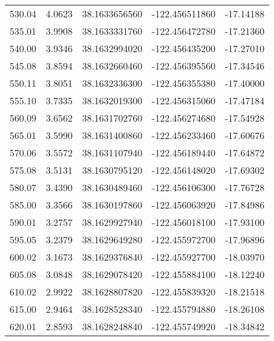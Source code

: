 \begin{scriptsize}
\begin{longtable}{p{2.5cm}p{2.5cm}p{3cm}p{3cm}p{2.5cm}}
           530.04  & 	 4.0623 &               38.1633656560  &   -122.456511860   &	-17.14188 \\
           535.01  & 	 3.9908 &               38.1633331760  &   -122.456472780   &	-17.21360 \\
           540.00  & 	 3.9346 &               38.1632994020  &   -122.456435200   &	-17.27010 \\
           545.08  & 	 3.8594 &               38.1632660460  &   -122.456395560   &	-17.34546 \\
           550.11  & 	 3.8051 &               38.1632336300  &   -122.456355380   &	-17.40000 \\
           555.10  & 	 3.7335 &               38.1632019300  &   -122.456315060   &	-17.47184 \\
           560.09  & 	 3.6562 &               38.1631702760  &   -122.456274680   &	-17.54928 \\
           565.01  & 	 3.5990 &               38.1631400860  &   -122.456233460   &	-17.60676 \\
           570.06  & 	 3.5572 &               38.1631107940  &   -122.456189440   &	-17.64872 \\
           575.08  & 	 3.5131 &               38.1630795120  &   -122.456148020   &	-17.69302 \\
           580.07  & 	 3.4390 &               38.1630489460  &   -122.456106300   &	-17.76728 \\
           585.00  & 	 3.3566 &               38.1630197860  &   -122.456063920   &	-17.84986 \\
           590.01  & 	 3.2757 &               38.1629927940  &   -122.456018100   &	-17.93100 \\
           595.05  & 	 3.2379 &               38.1629649280  &   -122.455972700   &	-17.96896 \\
           600.02  & 	 3.1673 &               38.1629376840  &   -122.455927700   &	-18.03970 \\
           605.08  & 	 3.0848 &               38.1629078420  &   -122.455884100   &	-18.12240 \\
           610.02  & 	 2.9922 &               38.1628807820  &   -122.455839320   &	-18.21518 \\
           615.00  & 	 2.9464 &               38.1628528340  &   -122.455794880   &	-18.26108 \\
           620.01  & 	 2.8593 &               38.1628248840  &   -122.455749920   &	-18.34842 \\

\end{longtable}
\end{scriptsize}
